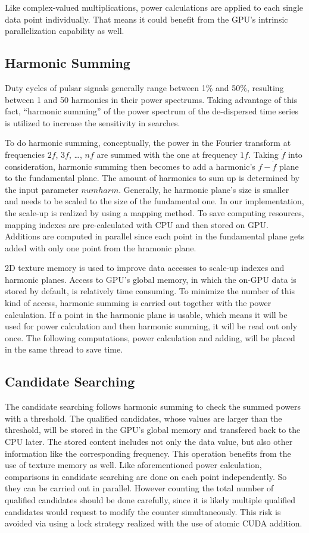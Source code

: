 \documentclass[preprint2]{aastex}
\begin{document}
Like complex-valued multiplications, power calculations are applied to each single data point
individually. That means it could benefit from the GPU's intrinsic parallelization capability as well.

\subsection{Harmonic Summing}

Duty cycles of pulsar signals generally range between 1\% and 50\%\citep{joh91},
 resulting between 1 and 50 harmonics in their power spectrums. Taking advantage of 
this fact, ``harmonic summing'' of the power spectrum of the 
de-dispersed time series is utilized to increase the sensitivity in searches. 

To do harmonic summing, conceptually, the power in the Fourier transform at frequencies
$2f$, $3f$, \ldots, $nf$ are summed with the one at frequency $1f$.
Taking  $\dot{f}$ into consideration, harmonic summing then becomes
to add a harmonic's $f-\dot{f}$ plane to the fundamental plane. 
The amount of harmonics to sum up is determined by the input parameter $numharm$. 
Generally, he harmonic plane's size is smaller and needs to be scaled to the size of the fundamental one. In 
our implementation, the scale-up is realized by using a mapping method. To save computing resources, mapping
indexes are pre-calculated with CPU and then stored on GPU. Additions are computed in parallel since each point 
in the fundamental plane gets added with only one point from the hramonic plane. 

2D texture memory is used to improve data accesses to scale-up indexes and
harmonic planes. Access to GPU's global memory, in which the on-GPU data is stored by default, is relatively
time consuming. To minimize the number of 
this kind of access, harmonic summing is carried out together with the power calculation. If a point in the
harmonic plane is usable, which means it will be used for power calculation and then harmonic summing, it 
will be read out only once. The following computations, power calculation and adding, will be placed in the same 
thread to save time.

\subsection{Candidate Searching}
The candidate searching follows harmonic summing to check
the summed powers with a threshold.  
The qualified candidates, whose values are larger than the threshold, will be stored in the GPU's global memory and 
transfered back to the CPU later. The stored content includes not only the data value, but also other information like
the corresponding frequency. This operation benefits from the use of texture memory as well.
Like aforementioned power calculation, comparisons in candidate searching are done on each point independently. So they 
can be carried out in parallel. However counting the total number
of qualified candidates should be done carefully, since it is likely multiple qualified candidates would request to modify
the counter simultaneously. This risk is avoided via using a lock strategy realized with the use of atomic CUDA addition.
\end{document}
